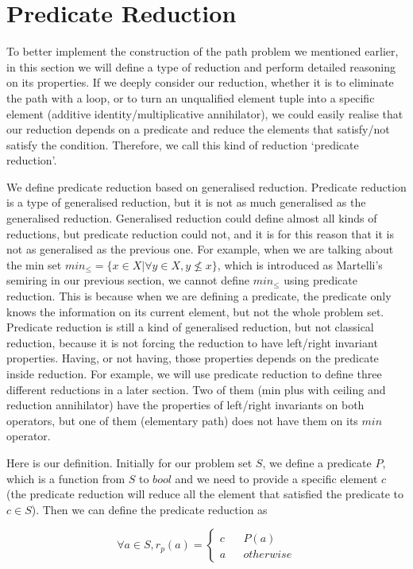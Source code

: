 \documentclass[a4paper,12pt,twoside,openright]{report}
\newcommand{\e}[2]{
\begin{equation}
  \label{#1} 
  #2
\end{equation}
}
\begin{document}
\section{Predicate Reduction}
To better implement the construction of the path problem we mentioned earlier, in this section we will define a type of reduction and perform detailed reasoning on its properties. 
If we deeply consider our reduction, whether it is to eliminate the path with a loop, or to turn an unqualified element tuple into a specific element (additive identity/multiplicative annihilator), we could easily realise that our reduction depends on a predicate and reduce the elements that satisfy/not satisfy the condition. Therefore, we call this kind of reduction ‘predicate reduction’. 

We define predicate reduction based on generalised reduction. 
Predicate reduction is a type of generalised reduction, but it is not as much generalised as the generalised reduction.  Generalised reduction could define almost all kinds of reductions, but predicate reduction could not, and it is for this reason that it is not as generalised as the previous one. For example, when we are talking about the min set $min_\leq = \{ x \in X | \forall y \in X, y \not\leq x \}$, which is introduced as Martelli’s semiring in our previous section, we cannot define $min_\leq$ using predicate reduction. This is because when we are defining a predicate, the predicate only knows the information on its current element, but not the whole problem set. Predicate reduction is still a kind of generalised reduction, but not classical reduction, because it is not forcing the reduction to have left/right invariant properties. Having, or not having, those properties depends on the predicate inside reduction. For example, we will use predicate reduction to define three different reductions in a later section. Two of them (min plus with ceiling and reduction annihilator) have the properties of left/right invariants on both operators, but one of them (elementary path) does not have them on its $min$ operator. 

Here is our definition. Initially for our problem set $S$, we define a predicate $P$, which is a function from $S$ to $bool$ and we need to provide a specific element $c$ (the predicate reduction will reduce all the element that satisfied the predicate to $c \in S$). Then we can define the predicate reduction as 
\e{pr:def:def}{\forall a \in S, r_p(a)=\left\{
\begin{aligned}
c &  & P(a) \\
a &  & otherwise 
\end{aligned}
\right.}
\end{document}
